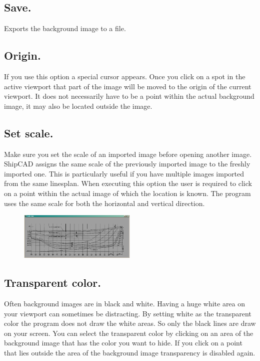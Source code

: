 \documentclass[12pt]{article}
\begin{document}
\subsection{Save.}
Exports the background image to a file.

\subsection{Origin.}
If you use this option a special cursor appears. Once you click on a
spot in the active viewport that part of the image will be moved to
the origin of the current viewport. It does not necessarily have to be
a point within the actual background image, it may also be located
outside the image.

\subsection{Set scale.}
Make sure you set the scale of an imported image before opening another image. ShipCAD
assigns the same scale of the previously imported image to the freshly imported one. This is
particularly useful if you have multiple images imported from the same linesplan. When executing
this option the user is required to click on a point within the actual image of which the location is
known. The program uses the same scale for both the horizontal and vertical direction.

\begin{figure}
        \centering
        \includegraphics[width=0.5\textwidth,natwidth=581,natheight=236]{backgroundimage-2.png}
        \caption{}
        \label{fig:backgroundimage2}
\end{figure}

\subsection{Transparent color.}
Often background images are in black and white. Having a huge white
area on your viewport can sometimes be distracting. By setting white
as the transparent color the program does not draw the white areas. So
only the black lines are draw on your screen. You can select the
transparent color by clicking on an area of the background image that
has the color you want to hide. If you click on a point that lies
outside the area of the background image transparency is disabled
again.
\end{document}
